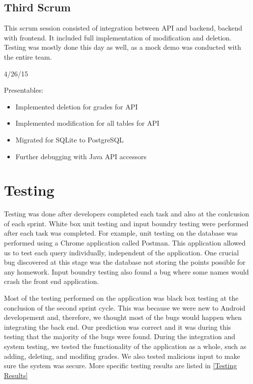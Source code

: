 \documentclass[a4paper]{article} %
\begin{document}
\subsection{Third Scrum}

This scrum session consisted of integration between API and backend, backend with frontend. It included full implementation of modification and deletion. Testing was mostly done this day as well, as a mock demo was conducted with the entire team. 

4/26/15


Presentables: 

\begin{itemize}
  \item Implemented deletion for grades for API
    \item Implemented modification for all tables for API
    \item Migrated for SQLite to PostgreSQL
    \item Further debugging with Java API accessors
\end{itemize}

\section{Testing}
Testing was done after developers completed each task and also at the conlcusion of each sprint. White box unit testing and input boundry testing were performed after each task was completed. For example, unit testing on the database was performed using a Chrome application called Postman. This application allowed us to test each query individually, independent of the application. One crucial bug discovered at this stage was the database not storing the points possible for any homework. Input boundry testing also found a bug where some names would crash the front end application.

Most of the testing performed on the application was black box testing at the conclusion of the second sprint cycle. This was because we were new to Android developement and, therefore, we thought most of the bugs would happen when integrating the back end. Our prediction was correct and it was during this testing that the majority of the bugs were found. During the integration and system testing, we tested the functionality of the application as a whole, such as adding, deleting, and modifing grades. We also tested malicious input to make sure the system was secure. More specific testing results are listed in \ref{Testing Results}
\end{document}
